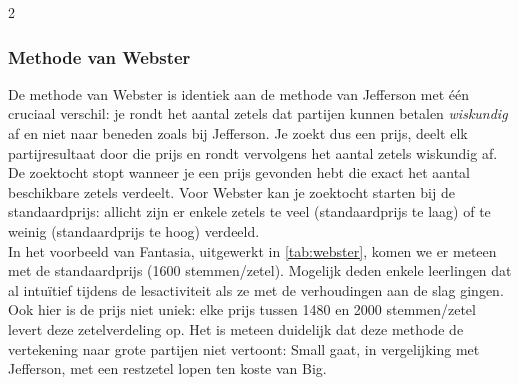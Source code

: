 \begin{multicols}{2}
\subsubsection{Methode van Webster}
De methode van Webster is identiek aan de methode van Jefferson met één cruciaal verschil: je rondt het aantal zetels dat partijen kunnen betalen \textit{wiskundig} af en niet naar beneden zoals bij Jefferson. Je zoekt dus een prijs, deelt elk partijresultaat door die prijs en rondt vervolgens het aantal zetels wiskundig af. De zoektocht stopt wanneer je een prijs gevonden hebt die exact het aantal beschikbare zetels verdeelt. Voor Webster kan je zoektocht starten bij de standaardprijs: allicht zijn er enkele zetels te veel (standaardprijs te laag) of te weinig (standaardprijs te hoog) verdeeld.\\
In het voorbeeld van Fantasia, uitgewerkt in \autoref{tab:webster}, komen we er meteen met de standaardprijs (1600 stemmen/zetel). Mogelijk deden enkele leerlingen dat al intuïtief tijdens de lesactiviteit als ze met de verhoudingen aan de slag gingen. Ook hier is de prijs niet uniek: elke prijs tussen 1480 en 2000 stemmen/zetel levert deze zetelverdeling op. Het is meteen duidelijk dat deze methode de vertekening naar grote partijen niet vertoont: Small gaat, in vergelijking met Jefferson, met een restzetel lopen ten koste van Big. 


\end{multicols}
